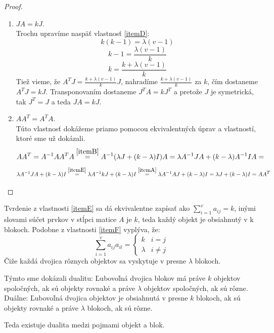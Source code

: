 \begin{proof}
\begin{enumerate}
	\item $J A = k J$. \label{itemE} \\
	Trochu upravíme naspäť vlastnosť \ref{itemD}:
	$$ k (k - 1) = \lambda (v - 1) $$
	$$ k - 1 = \frac{\lambda (v - 1)}{k} $$
	$$ k = \frac{k + \lambda (v - 1)}{k} $$
	Tiež vieme, že $A^T J = \frac{k + \lambda (v - 1)}{k} J$, nahradíme $\frac{k + \lambda (v - 1)}{k}$ za $k$, čím dostaneme $A^T J = k J$. Transponovaním dostaneme $J^T A = k J^T$ a pretože $J$ je symetrická, tak $J^T = J$ a teda $J A = k J$.

	\item $A A^T = A^T A$. \label{itemF} \\
	Túto vlastnosť dokážeme priamo pomocou ekvivalentných úprav a vlastností, ktoré sme už dokázali. 
	\begin{equation*}
		A A^T = A^{-1} A A^T A \overset{\ref{itemB}}{=} A^{-1} (\lambda J + (k - \lambda) I) A = \lambda A^{-1} J A + (k - \lambda) A^{-1} I A = 
	\end{equation*}
	\begin{equation*}
		\lambda A^{-1} J A + (k - \lambda) I \overset{\ref{itemE}}{=} \lambda A^{-1} k J + (k - \lambda) I \overset{\ref{itemA}}{=} \lambda A^{-1} A J + (k - \lambda) I = \lambda J + (k - \lambda) I = A A^T
	\end{equation*}
\end{enumerate}
\end{proof}

\begin{remark}
	Tvrdenie z vlastnosti \ref{itemE} sa dá ekvivalentne zapísať ako $\sum\limits_{i=1}^{v} a_{ij} = k$, inými slovami súčet prvkov v stĺpci matice $A$ je $k$, teda každý objekt je obsiahnutý v k blokoch. Podobne z vlastnosti \ref{itemF} vyplýva, že: 
	\begin{equation*}
		\sum_{i=1}^{v} a_{ij} a_{il} = \begin{cases}
					k               & i = j\\
					\lambda         & i \neq j
				\end{cases}
	\end{equation*}
	Čiže každá dvojica rôznych objektov sa vyskytuje v presne $\lambda$ blokoch.

	Týmto sme dokázali dualitu: Ľubovoľná dvojica blokov má práve $k$ objektov spoločných, ak sú objekty rovnaké a práve $\lambda$ objektov spoločných, ak sú rôzne. Duálne: Ľubovoľná dvojica objektov je obsiahnutá v presne $k$ blokoch, ak sú objekty rovnaké a práve $\lambda$ blokoch, ak sú rôzne.

	Teda existuje dualita medzi pojmami objekt a blok.

\end{remark}

